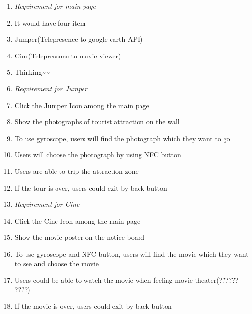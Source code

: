 \documentclass{article}
\begin{document}
\begin{enumerate}
\item  \textit{Requirement for main page}

\item \textit{ }It would  have four item\textit{}

\item \textit{ }Jumper(Telepresence to google earth API)\textit{}

\item \textit{ }Cine(Telepresence to movie viewer)\textit{}

\item \textit{ }Thinking\~{}\~{}\textit{}

\item \textit{ Requirement for Jumper}

\item \textit{ }Click the Jumper Icon among the main page\textit{}

\item \textit{ }Show the photographs of tourist attraction on the wall\textit{}

\item \textit{ }To use gyroscope, users will  find the photograph which they want to go\textit{}

\item \textit{ }Users will choose the photograph by using NFC button\textit{}

\item \textit{ }Users are able to trip the attraction zone\textit{}

\item \textit{ }If the tour is over, users could exit by back button\textit{}

\item \textit{ Requirement for Cine}

\item \textit{ }Click the Cine Icon among the main page\textit{}

\item \textit{ }Show the movie poster on the notice board\textit{}

\item \textit{ }To use gyroscope and NFC button, users will find the movie which they want to see and choose the movie\textit{}

\item \textit{ }Users could be able to watch the movie when feeling movie theater(?????? ????)\textit{}

\item \textit{ }If the movie is over, users could exit by back button\textit{}
\end{enumerate}
\end{document}
